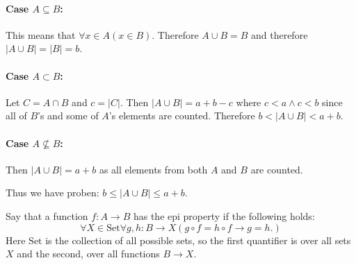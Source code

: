 \documentclass[letterpaper,12pt,addpoints,answers]{exam}
\begin{document}
\begin{questions}
\begin{parts}
        \begin{solutionorlines}[2in]
            \paragraph{Case $A \subseteq B$:} This means that $\forall x \in A(x \in B)$. Therefore $A \cup B = B$ and therefore $|A\cup B| = |B| = b$.
            \paragraph{Case $A \subset B$:} Let $C = A \cap B$ and $c = |C|$. Then $|A \cup B| = a + b - c$ where $c < a \land c < b$ since all of $B$'s and some of $A$'s elements are counted. Therefore $b < |A \cup B| < a + b$.
            \paragraph{Case $A \nsubseteq B$:} Then $|A \cup B| = a + b$ as all elements from both $A$ and $B$ are counted.

            \vspace{0.5cm}

            Thus we have proben: $b \leq |A\cup B| \leq a + b$.
        \end{solutionorlines}

    \end{parts}

    \question Say that a function $f:A\to B$ has the epi property if the following holds:
    \[\forall X\in\mathrm{Set}\forall g,h:B\to X (g\circ f=h\circ f\to g=h.)\]
    Here $\mathrm{Set}$ is the collection of all possible sets, so the first quantifier is over all sets
    $X$ and the second, over all functions $B\to X.$
\end{questions}
\end{document}
